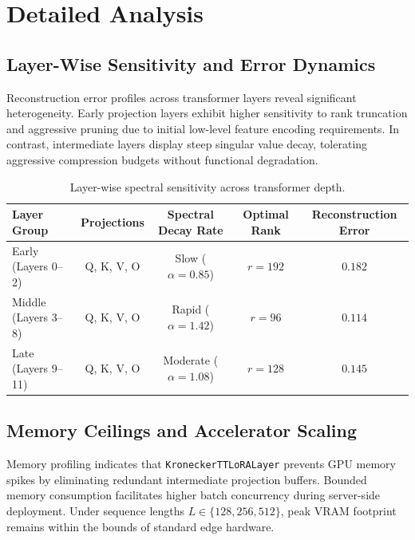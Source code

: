 \section{Detailed Analysis}

\subsection{Layer-Wise Sensitivity and Error Dynamics}
Reconstruction error profiles across transformer layers reveal significant heterogeneity. Early projection layers exhibit higher sensitivity to rank truncation and aggressive pruning due to initial low-level feature encoding requirements. In contrast, intermediate layers display steep singular value decay, tolerating aggressive compression budgets without functional degradation.

\begin{table}[H]
\centering
\small
\begin{tabular}{lcccc}
\toprule
\textbf{Layer Group} & \textbf{Projections} & \textbf{Spectral Decay Rate} & \textbf{Optimal Rank} & \textbf{Reconstruction Error} \\
\midrule
Early (Layers 0--2) & Q, K, V, O & Slow ($\alpha = 0.85$) & $r=192$ & $0.182$ \\
Middle (Layers 3--8) & Q, K, V, O & Rapid ($\alpha = 1.42$) & $r=96$ & $0.114$ \\
Late (Layers 9--11) & Q, K, V, O & Moderate ($\alpha = 1.08$) & $r=128$ & $0.145$ \\
\bottomrule
\end{tabular}
\caption{Layer-wise spectral sensitivity across transformer depth.}
\label{tab:layer_sensitivity}
\end{table}

\subsection{Memory Ceilings and Accelerator Scaling}
Memory profiling indicates that \texttt{KroneckerTTLoRALayer} prevents GPU memory spikes by eliminating redundant intermediate projection buffers. Bounded memory consumption facilitates higher batch concurrency during server-side deployment. Under sequence lengths $L \in \{128, 256, 512\}$, peak VRAM footprint remains within the bounds of standard edge hardware.

